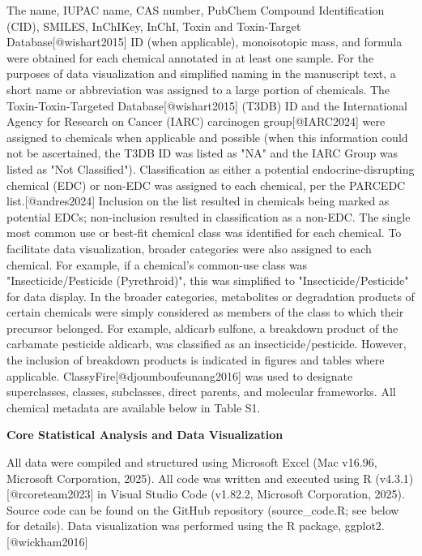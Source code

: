 The name, IUPAC name, CAS number, PubChem Compound Identification (CID), SMILES, InChIKey, InChI, Toxin and Toxin-Target Database[@wishart2015] ID (when applicable), monoisotopic mass, and formula were obtained for each chemical annotated in at least one sample. 
For the purposes of data visualization and simplified naming in the manuscript text, a short name or abbreviation was assigned to a large portion of chemicals. 
The Toxin-Toxin-Targeted Database[@wishart2015] (T3DB) ID and the International Agency for Research on Cancer (IARC) carcinogen group[@IARC2024] were assigned to chemicals when applicable and possible (when this information could not be ascertained, the T3DB ID was listed as "NA" and the IARC Group was listed as "Not Classified"). 
Classification as either a potential endocrine-disrupting chemical (EDC) or non-EDC was assigned to each chemical, per the PARCEDC list.[@andres2024] 
Inclusion on the list resulted in chemicals being marked as potential EDCs; non-inclusion resulted in classification as a non-EDC. 
The single most common use or best-fit chemical class was identified for each chemical. 
To facilitate data visualization, broader categories were also assigned to each chemical. 
For example, if a chemical's common-use class was "Insecticide/Pesticide (Pyrethroid)", this was simplified to "Insecticide/Pesticide" for data display. 
In the broader categories, metabolites or degradation products of certain chemicals were simply considered as members of the class to which their precursor belonged. 
For example, aldicarb sulfone, a breakdown product of the carbamate pesticide aldicarb, was classified as an insecticide/pesticide. 
However, the inclusion of breakdown products is indicated in figures and tables where applicable. 
ClassyFire[@djoumboufeunang2016] was used to designate superclasses, classes, subclasses, direct parents, and molecular frameworks. 
All chemical metadata are available below in Table S1.

\vspace{1em}

\noindent\textbf{Core Statistical Analysis and Data Visualization}

All data were compiled and structured using Microsoft Excel (Mac v16.96, Microsoft Corporation, 2025). All code was written and executed using R (v4.3.1)[@rcoreteam2023] in Visual Studio Code (v1.82.2, Microsoft Corporation, 2025). Source code can be found on the GitHub repository (source\_code.R; see below for details). Data visualization was performed using the R package, ggplot2.[@wickham2016]
\vspace{1em}

